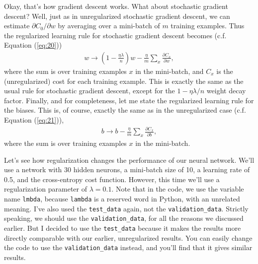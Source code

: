 \documentclass[a4paper,twoside,10pt]{book}
\begin{document}
Okay, that's how gradient descent works. What about stochastic gradient descent? Well, just as in unregularized stochastic gradient descent, we can estimate $\partial{}C_0/\partial{}w$ by averaging over a mini-batch of $m$ training examples. Thus the regularized learning rule for stochastic gradient descent becomes (c.f. Equation (\ref{eq:20}))
\begin{eqnarray} 
w \rightarrow \left(1-\frac{\eta \lambda}{n}\right) w -\frac{\eta}{m} \sum_x \frac{\partial C_x}{\partial w}, 
\label{eq:93}
\end{eqnarray}
where the sum is over training examples $x$ in the mini-batch, and $C_x$ is the (unregularized) cost for each training example. This is exactly the same as the usual rule for stochastic gradient descent, except for the $1−\eta\lambda/n$ weight decay factor. Finally, and for completeness, let me state the regularized learning rule for the biases. This is, of course, exactly the same as in the unregularized case (c.f. Equation (\ref{eq:21})),
\begin{eqnarray}
	b \to b - \frac{\eta}{m} \sum_x \frac{\partial C_x}{\partial b},
	\label{eq:94}
\end{eqnarray}
where the sum is over training examples $x$ in the mini-batch.

Let's see how regularization changes the performance of our neural network. We'll use a network with 30 hidden neurons, a mini-batch size of 10, a learning rate of 0.5, and the cross-entropy cost function. However, this time we'll use a regularization parameter of $\lambda =0.1$. Note that in the code, we use the variable name \texttt{lmbda}, because \texttt{lambda} is a reserved word in Python, with an unrelated meaning. I've also used the \texttt{test\_data} again, not the \texttt{validation\_data}. Strictly speaking, we should use the \texttt{validation\_data}, for all the reasons we discussed earlier. But I decided to use the \texttt{test\_data} because it makes the results more directly comparable with our earlier, unregularized results. You can easily change the code to use the \texttt{validation\_data} instead, and you'll find that it gives similar results.
\end{document}
